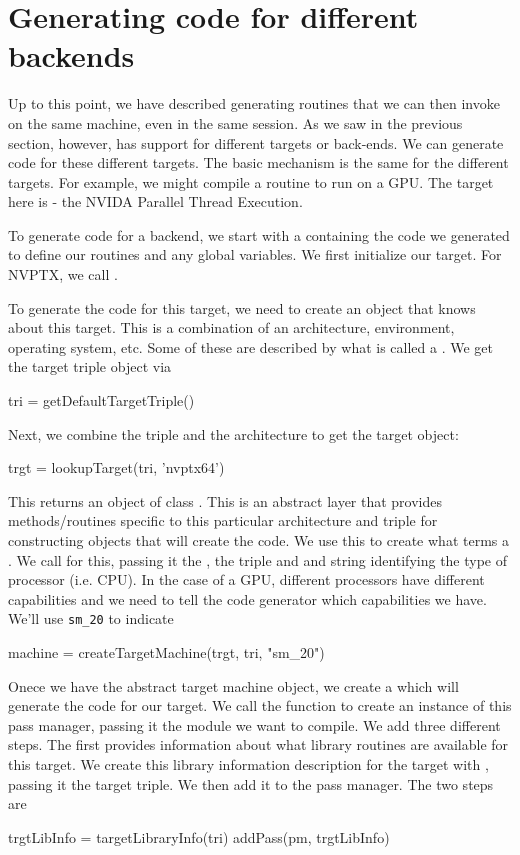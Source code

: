



\section{Generating code for different backends}
Up to this point, we have described generating routines
that we can then invoke on the same machine, even in the
same \R{} session.
As we saw in the previous section, however, \llvm{}
has support for different targets or back-ends.
We can generate  code for these different targets.
The basic mechanism is the same for the different targets.
For example, we might compile a routine to run on a GPU.
The target here is  - the NVIDA Parallel Thread Execution.

To generate code for a backend, we start with a  containing the code we generated
to define our routines and any global variables.
We first initialize our target. For NVPTX, we call 
.

To generate the code for this target, we need to create
an object that knows about this target. This is a combination
of an architecture, environment, operating system, etc.
Some of these are described by what is called a .
We get the target triple object via 
\begin{RCode}
tri = getDefaultTargetTriple() 
\end{RCode}
Next, we combine the triple and the architecture to 
get the target object:
\begin{RCode}
trgt = lookupTarget(tri, 'nvptx64')
\end{RCode}
This returns an object of class .  This is an abstract
layer that provides methods/routines specific to this particular
architecture and triple for constructing objects that will create the
code.  We use this to create what \llvm{} terms a
.
We call  for this,
passing it the , the triple and
and string identifying the type of processor (i.e. CPU).
In the case of a GPU, different processors have different
capabilities and we need to tell the code generator 
which capabilities we have. We'll use \texttt{sm_20}
to indicate 
\begin{RCode}
machine = createTargetMachine(trgt, tri, "sm_20") 
\end{RCode}


Onece we have the abstract target machine object, 
we create a  which will generate the
code for our target.
We call the  function to create an instance
of this pass manager, passing it the module we want to compile.
We add three different  steps.
The first provides information about what library routines
are available for this target.
We create this library information description for the target with
, passing it the target triple.
We then add it to the pass manager. The two steps are 
\begin{RCode}
trgtLibInfo = targetLibraryInfo(tri)
addPass(pm, trgtLibInfo)
\end{RCode}

